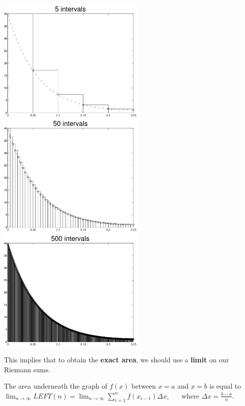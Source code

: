\begin{center}
\includegraphics[height=6cm]{graphics/notes_04_f_lhr_5_intervals}
\includegraphics[height=6cm]{graphics/notes_04_f_lhr_50_intervals}
\includegraphics[height=6cm]{graphics/notes_04_f_lhr_500_intervals}
\end{center}

This implies that to obtain the {\bf
  exact area}, we should use a {\bf limit} on our Riemann sums.

\medskip
\begin{center}
The area underneath the graph of $f(x)$ between $x=a$ and $x=b$ is equal to $\displaystyle\lim_{n \to \infty} LEFT(n) = 
\displaystyle\lim_{n \to \infty} \displaystyle\sum_{i=1}^{n} f(x_{i-1})\Delta x$, ~~~where $\Delta x = \displaystyle\frac{b-a}{n}$.
\end{center}

